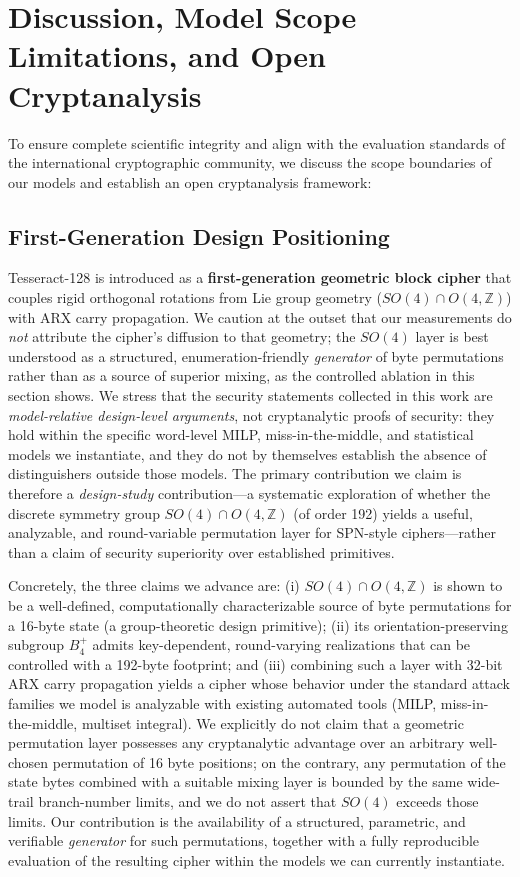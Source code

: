 \documentclass[review,12pt]{elsarticle}
\begin{document}
\section{Discussion, Model Scope Limitations, and Open Cryptanalysis}
\label{sec:discussion}

To ensure complete scientific integrity and align with the evaluation standards of the international cryptographic community, we discuss the scope boundaries of our models and establish an open cryptanalysis framework:

\subsection{First-Generation Design Positioning}
Tesseract-128 is introduced as a \textbf{first-generation geometric block cipher} that couples rigid orthogonal rotations from Lie group geometry ($SO(4) \cap O(4, \mathbb{Z})$) with ARX carry propagation. We caution at the outset that our measurements do \emph{not} attribute the cipher's diffusion to that geometry; the $SO(4)$ layer is best understood as a structured, enumeration-friendly \emph{generator} of byte permutations rather than as a source of superior mixing, as the controlled ablation in this section shows. We stress that the security statements collected in this work are \emph{model-relative design-level arguments}, not cryptanalytic proofs of security: they hold within the specific word-level MILP, miss-in-the-middle, and statistical models we instantiate, and they do not by themselves establish the absence of distinguishers outside those models. The primary contribution we claim is therefore a \emph{design-study} contribution---a systematic exploration of whether the discrete symmetry group $SO(4) \cap O(4, \mathbb{Z})$ (of order 192) yields a useful, analyzable, and round-variable permutation layer for SPN-style ciphers---rather than a claim of security superiority over established primitives.

Concretely, the three claims we advance are: (i) $SO(4) \cap O(4, \mathbb{Z})$ is shown to be a well-defined, computationally characterizable source of byte permutations for a 16-byte state (a group-theoretic design primitive); (ii) its orientation-preserving subgroup $B_4^+$ admits key-dependent, round-varying realizations that can be controlled with a 192-byte footprint; and (iii) combining such a layer with 32-bit ARX carry propagation yields a cipher whose behavior under the standard attack families we model is analyzable with existing automated tools (MILP, miss-in-the-middle, multiset integral). We explicitly do not claim that a geometric permutation layer possesses any cryptanalytic advantage over an arbitrary well-chosen permutation of 16 byte positions; on the contrary, any permutation of the state bytes combined with a suitable mixing layer is bounded by the same wide-trail branch-number limits, and we do not assert that $SO(4)$ exceeds those limits. Our contribution is the availability of a structured, parametric, and verifiable \emph{generator} for such permutations, together with a fully reproducible evaluation of the resulting cipher within the models we can currently instantiate.
\end{document}
